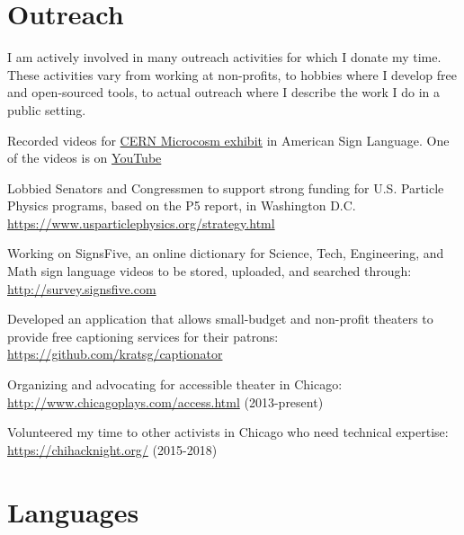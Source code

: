 \documentclass[margin,line]{resume}
\let\origsection\section%
\let\section\subsection%
\let\section\origsection%
\begin{document}
\begin{resume}

\section{\mysidestyle Outreach}
I am actively involved in many outreach activities for which I donate my time. These activities vary from working at non-profits, to hobbies where I develop free and open-sourced tools, to actual outreach where I describe the work I do in a public setting.
\begin{list2}
\item Recorded videos for \href{https://microcosm.web.cern.ch/en}{CERN Microcosm exhibit} in American Sign Language. One of the videos is on \href{https://www.youtube.com/watch?v=BaGjAruqFec}{YouTube}
  \item Lobbied Senators and Congressmen to support strong funding for U.S. Particle Physics programs, based on the P5 report, in Washington D.C. \url{https://www.usparticlephysics.org/strategy.html}
  \item Working on SignsFive, an online dictionary for Science, Tech, Engineering, and Math sign language videos to be stored, uploaded, and searched through: \url{http://survey.signsfive.com}
  \item Developed an application that allows small-budget and non-profit theaters to provide free captioning services for their patrons: \url{https://github.com/kratsg/captionator}
  \item Organizing and advocating for accessible theater in Chicago: \url{http://www.chicagoplays.com/access.html} (2013-present)
  \item Volunteered my time to other activists in Chicago who need technical expertise: \url{https://chihacknight.org/} (2015-2018)
\end{list2}

\section{\mysidestyle Languages}


\end{resume}
\end{document}
